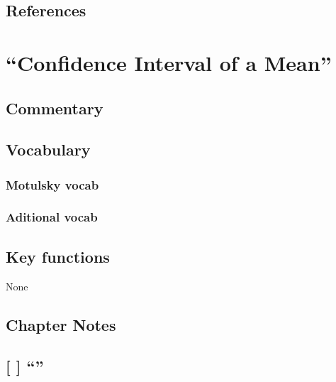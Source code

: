 \documentclass[]{book}
\theoremstyle{definition}
\theoremstyle{definition}
\theoremstyle{definition}
\theoremstyle{remark}
\begin{document}
\section*{References}\label{references-9}

\chapter{\texorpdfstring{``Confidence Interval of a
Mean''}{Confidence Interval of a Mean}}\label{ch12}

\section*{Commentary}\label{commentary-10}

\section*{Vocabulary}\label{vocabulary-11}

\subsection*{Motulsky vocab}\label{motulsky-vocab-11}

\subsection*{Aditional vocab}\label{aditional-vocab-8}

\section*{Key functions}\label{key-functions-10}

None

\section*{Chapter Notes}\label{chapter-notes-11}

\section{\texorpdfstring{{[} {]} ``''}{{[} {]} }}\label{section-15}
\end{document}
